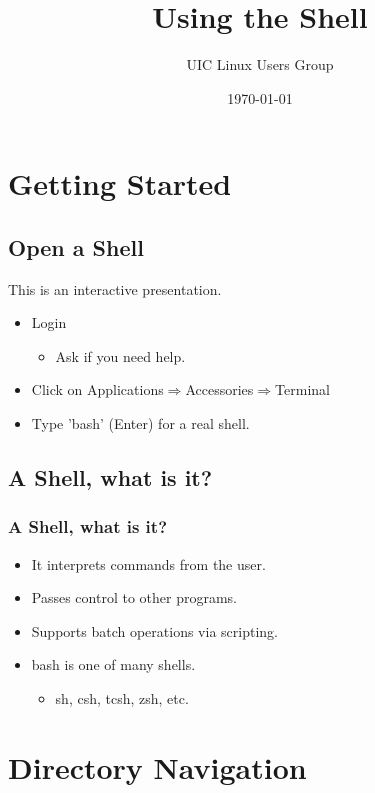 \documentclass[hyperref={pdfpagelabels=false}]{beamer}
\title{Using the Shell}
\author{UIC Linux Users Group}
\date{\today}
\begin{document}
\frame{\titlepage}
\section{Getting Started}
\subsection{Open a Shell}
\frame
{
    This is an interactive presentation.
    \begin{itemize}
    \item{Login}
        \begin{itemize}
        \item{Ask if you need help.}
        \end{itemize}
    \item{ Click on Applications$\Rightarrow$Accessories$\Rightarrow$Terminal}
    \item{ Type 'bash' (Enter) for a real shell.}
    \end{itemize}
   
}
\subsection{A Shell, what is it?}
\frame
{
    \frametitle{A Shell, what is it?}
    \begin{itemize}
    \item{It interprets commands from the user.}
    \item{Passes control to other programs.}
    \item{Supports batch operations via scripting.}
    \item{bash is one of many shells.}
        \begin{itemize}
        \item{sh, csh, tcsh, zsh, etc.}
        \end{itemize}
    \end{itemize}
}
\section{Directory Navigation}
\end{document}
